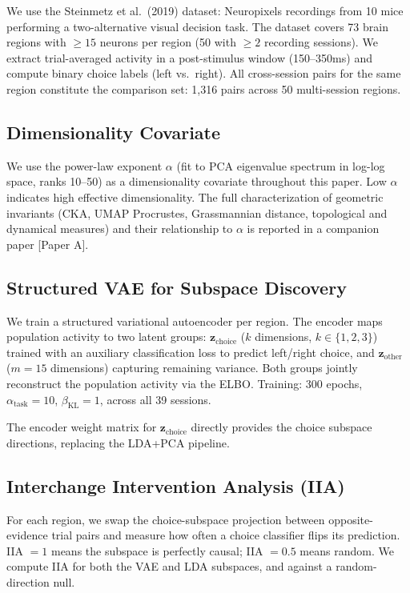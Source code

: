 \documentclass{article}
\begin{document}
We use the Steinmetz et al.\ (2019) dataset: Neuropixels recordings from 10 mice performing a two-alternative visual decision task. The dataset covers 73 brain regions with $\geq 15$ neurons per region (50 with $\geq 2$ recording sessions). We extract trial-averaged activity in a post-stimulus window (150--350ms) and compute binary choice labels (left vs.\ right). All cross-session pairs for the same region constitute the comparison set: 1,316 pairs across 50 multi-session regions.

\subsection{Dimensionality Covariate}

We use the power-law exponent $\alpha$ (fit to PCA eigenvalue spectrum in log-log space, ranks 10--50) as a dimensionality covariate throughout this paper. Low $\alpha$ indicates high effective dimensionality. The full characterization of geometric invariants (CKA, UMAP Procrustes, Grassmannian distance, topological and dynamical measures) and their relationship to $\alpha$ is reported in a companion paper [Paper A].

\subsection{Structured VAE for Subspace Discovery}

We train a structured variational autoencoder \citep{narayanaswamy2017learning} per region. The encoder maps population activity to two latent groups: $\mathbf{z}_{\text{choice}}$ ($k$ dimensions, $k \in \{1,2,3\}$) trained with an auxiliary classification loss to predict left/right choice, and $\mathbf{z}_{\text{other}}$ ($m = 15$ dimensions) capturing remaining variance. Both groups jointly reconstruct the population activity via the ELBO. Training: 300 epochs, $\alpha_{\text{task}} = 10$, $\beta_{\text{KL}} = 1$, across all 39 sessions.

The encoder weight matrix for $\mathbf{z}_{\text{choice}}$ directly provides the choice subspace directions, replacing the LDA+PCA pipeline.

\subsection{Interchange Intervention Analysis (IIA)}

For each region, we swap the choice-subspace projection between opposite-evidence trial pairs and measure how often a choice classifier flips its prediction. IIA $= 1$ means the subspace is perfectly causal; IIA $= 0.5$ means random. We compute IIA for both the VAE and LDA subspaces, and against a random-direction null.
\end{document}
